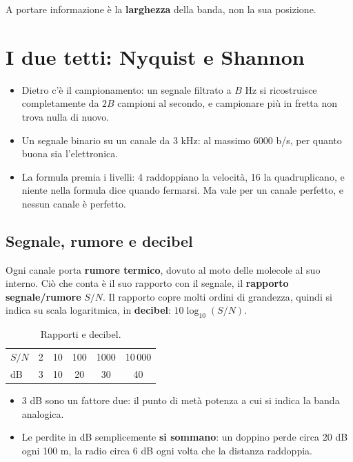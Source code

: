 A portare informazione è la \textbf{larghezza} della banda, non la sua posizione.

\section{I due tetti: Nyquist e Shannon}


\begin{itemize}
    \item Dietro c'è il campionamento: un segnale filtrato a $B$ Hz si ricostruisce completamente da $2B$ campioni al secondo, e
          campionare più in fretta non trova nulla di nuovo.
    \item Un segnale binario su un canale da 3 kHz: al massimo 6000 b/s, per quanto buona sia l'elettronica.
    \item La formula premia i livelli: 4 raddoppiano la velocità, 16 la quadruplicano, e niente nella formula dice quando fermarsi.
          Ma vale per un canale perfetto, e nessun canale è perfetto.
\end{itemize}

\subsection{Segnale, rumore e decibel}

Ogni canale porta \textbf{rumore termico}, dovuto al moto delle molecole al suo interno. Ciò che conta è il suo rapporto con il
segnale, il \textbf{rapporto segnale/rumore} $S/N$. Il rapporto copre molti ordini di grandezza, quindi si indica su scala
logaritmica, in \textbf{decibel}: $10 \log_{10}(S/N)$.

\begin{table}[H]
\centering
\begin{tabular}{lccccc}
\toprule
$S/N$ & 2 & 10 & 100 & 1000 & 10\,000 \\
dB & 3 & 10 & 20 & 30 & 40 \\
\bottomrule
\end{tabular}
\caption{Rapporti e decibel.}
\end{table}

\begin{itemize}
    \item 3 dB sono un fattore due: il punto di metà potenza a cui si indica la banda analogica.
    \item Le perdite in dB semplicemente \textbf{si sommano}: un doppino perde circa 20 dB ogni 100 m, la radio circa 6 dB ogni volta
          che la distanza raddoppia.
\end{itemize}

